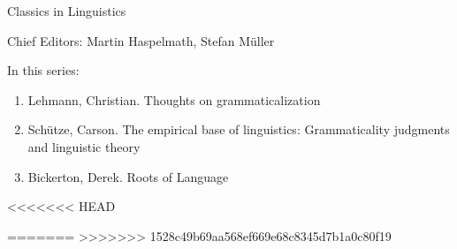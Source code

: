 {\large Classics in Linguistics}

\bigskip

Chief Editors: Martin Haspelmath, Stefan Müller

\bigskip

In this series:

\begin{enumerate}
\item Lehmann, Christian. Thoughts on grammaticalization
\item Schütze, Carson. The empirical base of linguistics: Grammaticality judgments and linguistic theory
\item Bickerton, Derek. Roots of Language
\end{enumerate}


\vfill

<<<<<<< HEAD


=======
>>>>>>> 1528c49b69aa568ef669e68c8345d7b1a0c80f19

